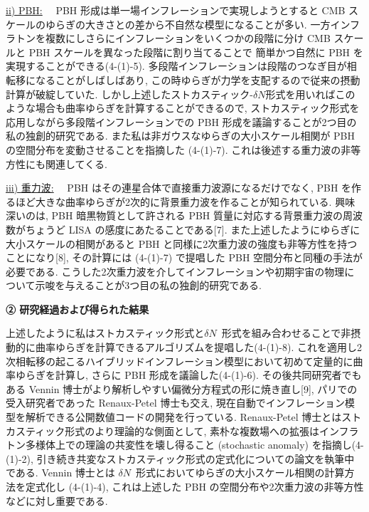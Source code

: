 \documentclass[11pt,a4paper,uplatex,twoside,dvipdfmx]{ujarticle} 	%
\newcommand{\subsubject}[1]{\noindent \ul{#1}~~}
\newcommand{\研究課題名}{\mgfamily ストカスティック形式、原始ブラックホール、重力波観測から迫るインフレーション}
\newcommand{\研究機関名}{\mgfamily 名古屋大学}
\newcommand{\申請者氏名}{\mgfamily 多田 祐一郎}
\newcommand{\研究代表者氏名}{\申請者氏名}
\newcommand{\研究期間の最終元号年度}{34}	%
\begin{document}
{	\vspace{3pt}
	\subsubject{ii) PBH:}
	PBH 形成は単一場インフレーションで実現しようとすると CMB スケールのゆらぎの大きさとの差から不自然な模型になることが多い.
	一方インフラトンを複数にしさらにインフレーションをいくつかの段階に分け CMB スケールと PBH スケールを異なった段階に割り当てることで
	簡単かつ自然に PBH を実現することができる(4-(1)-5).
	多段階インフレーションは段階のつなぎ目が相転移になることがしばしばあり, この時ゆらぎが力学を支配するので従来の摂動計算が破綻していた.
	しかし上述したストカスティック-$\delta N$形式を用いればこのような場合も曲率ゆらぎを計算することができるので,
	ストカスティック形式を応用しながら多段階インフレーションでの PBH 形成を議論することが2つ目の私の独創的研究である.
	また私は非ガウスなゆらぎの大小スケール相関が PBH の空間分布を変動させることを指摘した (4-(1)-7).
	これは後述する重力波の非等方性にも関連してくる.
	
	
	\vspace{3pt}
	\subsubject{iii) 重力波:}
	PBH はその連星合体で直接重力波源になるだけでなく, PBH を作るほど大きな曲率ゆらぎが2次的に背景重力波を作ることが知られている.
	興味深いのは, PBH 暗黒物質として許される PBH 質量に対応する背景重力波の周波数がちょうど LISA の感度にあたることである[7].
	また上述したようにゆらぎに大小スケールの相関があると PBH と同様に2次重力波の強度も非等方性を持つことになり[8],
	その計算には (4-(1)-7) で提唱した PBH 空間分布と同種の手法が必要である.
	こうした2次重力波を介してインフレーションや初期宇宙の物理について示唆を与えることが3つ目の私の独創的研究である.
	
	
	
	\begin{mdframed}[roundcorner=0.5zw,
	innertopmargin=0.8zw,innerbottommargin=0.8zw,
	linecolor=black!50,linewidth=0.2zw,
	backgroundcolor=black!10]
	{\bfseries\gtfamily\sffamily\large ② 研究経過および得られた結果}
	\end{mdframed}
	
	\vspace{-10pt}
	上述したように私はストカスティック形式と$\delta N$~形式を組み合わせることで非摂動的に曲率ゆらぎを計算できるアルゴリズムを提唱した(4-(1)-8).
	これを適用し2次相転移の起こるハイブリッドインフレーション模型において初めて定量的に曲率ゆらぎを計算し, さらに PBH 形成を議論した(4-(1)-6).
	その後共同研究者でもある Vennin 博士がより解析しやすい偏微分方程式の形に焼き直し[9],
	パリでの受入研究者であった Renaux-Petel 博士も交え, 現在自動でインフレーション模型を解析できる公開数値コードの開発を行っている.
	Renaux-Petel 博士とはストカスティック形式のより理論的な側面として,
	素朴な複数場への拡張はインフラトン多様体上での理論の共変性を壊し得ること (stochastic anomaly) を指摘し(4-(1)-2),
	引き続き共変なストカスティック形式の定式化についての論文を執筆中である.
	Vennin 博士とは $\delta N$~形式においてゆらぎの大小スケール相関の計算方法を定式化し (4-(1)-4),
	これは上述した PBH の空間分布や2次重力波の非等方性などに対し重要である.
	
}
\end{document}
